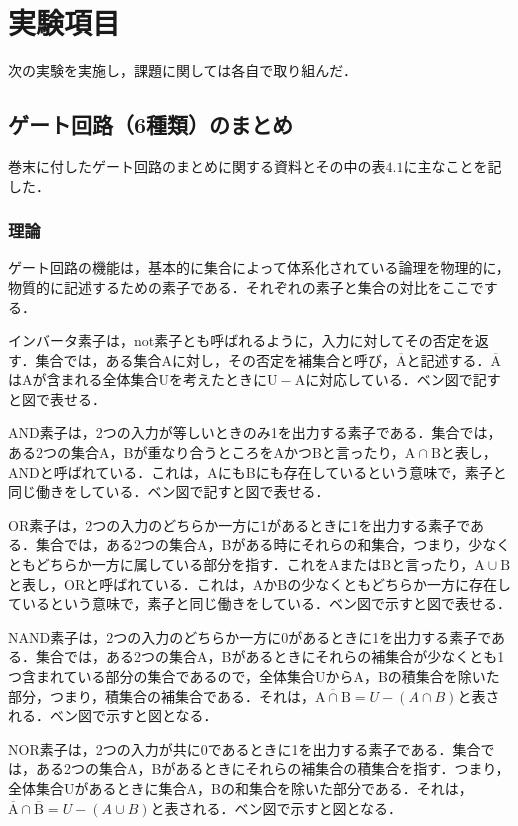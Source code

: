 %
%
%
\section{実験項目}
\label{experiment}
次の実験を実施し，課題に関しては各自で取り組んだ．

%
%
%
\subsection{ゲート回路（6種類）のまとめ}
\label{experiment_kairomatome}
巻末に付したゲート回路のまとめに関する資料とその中の表$4.1$に主なことを記した．
\subsubsection{理論}
\label{kairomatome_riron}
ゲート回路の機能は，基本的に集合によって体系化されている論理を物理的に，物質的に記述するための素子である．それぞれの素子と集合の対比をここでする．

インバータ素子は，not素子とも呼ばれるように，入力に対してその否定を返す．集合では，ある集合Aに対し，その否定を補集合と呼び，$\overline{\mathrm{A}}$と記述する．$\overline{\mathrm{A}}$はAが含まれる全体集合Uを考えたときに$\mathrm{U}-\mathrm{A}$に対応している．ベン図で記すと図で表せる．

AND素子は，2つの入力が等しいときのみ1を出力する素子である．集合では，ある2つの集合A，Bが重なり合うところをAかつBと言ったり，$\mathrm{A}\cap\mathrm{B}$と表し，ANDと呼ばれている．これは，AにもBにも存在しているという意味で，素子と同じ働きをしている．ベン図で記すと図で表せる．

OR素子は，2つの入力のどちらか一方に1があるときに1を出力する素子である．集合では，ある2つの集合A，Bがある時にそれらの和集合，つまり，少なくともどちらか一方に属している部分を指す．これをAまたはBと言ったり，$\mathrm{A}\cup\mathrm{B}$と表し，ORと呼ばれている．これは，AかBの少なくともどちらか一方に存在しているという意味で，素子と同じ働きをしている．ベン図で示すと図で表せる．

NAND素子は，2つの入力のどちらか一方に0があるときに1を出力する素子である．集合では，ある2つの集合A，Bがあるときにそれらの補集合が少なくとも1つ含まれている部分の集合であるので，全体集合UからA，Bの積集合を除いた部分，つまり，積集合の補集合である．それは，$\overline{\mathrm{A}\cap\mathrm{B}}=U-(A\cap B)$と表される．ベン図で示すと図となる．

NOR素子は，2つの入力が共に0であるときに1を出力する素子である．集合では，ある2つの集合A，Bがあるときにそれらの補集合の積集合を指す．つまり，全体集合Uがあるときに集合A，Bの和集合を除いた部分である．それは，$\overline{\mathrm{A}}\cap\overline{\mathrm{B}}=U-(A\cup B)$と表される．ベン図で示すと図となる．

